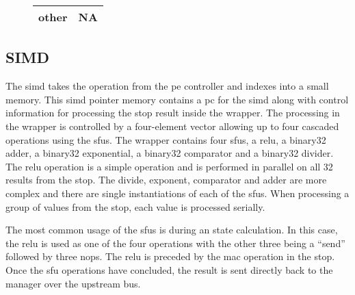 \begin{figure}[h]
\begin{minipage}{1\textwidth}
\begin{minipage}{1\textwidth}
\begin{minipage}[t]{1\textwidth}
\begin{minipage}[t]{0.25\textwidth}
\begin{adjustbox}{width=1\textwidth}
\begin{tabular}{ |c|c|  }
                other  & NA       \\
                \hline
              \end{tabular}
          \end{adjustbox}
        \end{minipage}
      \end{minipage}
    \end{minipage}
    \label{tab:stOp op fields}
  \end{minipage}
\end{figure}


\subsection{SIMD}
\label{sec:simd}

The \ac{simd} takes the operation from the \ac{pe} controller and indexes into a small memory. This \ac{simd} pointer memory contains a \ac{pc} for the \ac{simd} along with control information for processing the \ac{stop} result inside the wrapper.
The processing in the wrapper is controlled by a four-element vector allowing up to four cascaded operations using the \acp{sfu}.
The wrapper contains four \acp{sfu}, a \ac{relu}, a \ac{binary32} adder, a \ac{binary32} exponential, a \ac{binary32} comparator and a \ac{binary32} divider.
The \ac{relu} operation is a simple operation and is performed in parallel on all 32 results from the \ac{stop}.
The divide, exponent, comparator and adder are more complex and there are single instantiations of each of the \acp{sfu}.
When processing a group of values from the \ac{stop}, each value is processed serially.

The most common usage of the \acp{sfu} is during \ac{an} state calculation. In this case, the \ac{relu} is used as one of the four operations with the other three being a ``send'' followed by three \acp{nop}.
The \ac{relu} is preceded by the \ac{mac} operation in the \ac{stop}.
Once the \ac{sfu} operations have concluded, the result is sent directly back to the manager over the upstream bus.

